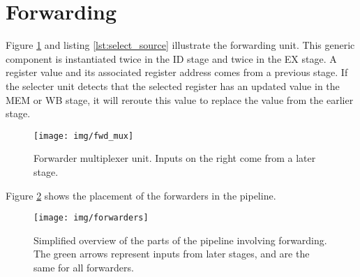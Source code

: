\section{Forwarding}
Figure \ref{fig:fwd_mux} and listing \ref{lst:select_source} illustrate the forwarding unit.
This generic component is instantiated twice in the ID stage and twice in the EX stage.
A register value and its associated register address comes from a previous stage.
If the selecter unit detects that the selected register has an updated value in the MEM or WB stage,
it will reroute this value to replace the value from the earlier stage.

\begin{figure}[h]
    \centering
    \texttt{[image: img/fwd\_mux]}
    \caption{Forwarder multiplexer unit. Inputs on the right come from a later stage.}
    \label{fig:fwd_mux}
\end{figure}


Figure \ref{fig:forwarders} shows the placement of the forwarders in the pipeline.

\begin{figure}[h]
    \centering
    \texttt{[image: img/forwarders]}
    \caption{Simplified overview of the parts of the pipeline involving forwarding. The green arrows represent inputs from later stages, and are the same for all forwarders.}
    \label{fig:forwarders}
\end{figure}


